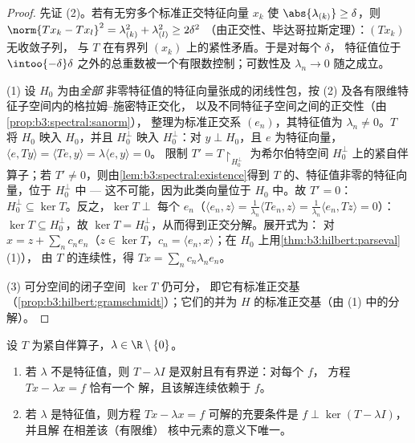 \begin{proof}
先证 (2)。若有无穷多个标准正交特征向量 $x_k$
使 $\abs{\lambda_{(k)}} \geq \delta$，则 $\norm{Tx_k - Tx_l}^2 =
\lambda_{(k)}^2 + \lambda_{(l)}^2 \geq 2\delta^2$
（由正交性、毕达哥拉斯定理）：$(Tx_k)$ 无收敛子列，
与 $T$ 在有界列
$(x_k)$ 上的紧性矛盾。于是对每个 $\delta$，
特征值位于
$\intoo{-\delta}\delta$ 之外的总重数被一个有限数控制；可数性及 $\lambda_n \to 0$
随之成立。

(1) 设 $H_0$ 为由\emph{全部}
非零特征值的特征向量张成的闭线性包，按
(2) 及各有限维特征子空间内的格拉姆–施密特正交化，
以及不同特征子空间之间的正交性（由\cref{prop:b3:spectral:sanorm}），
整理为标准正交系
$(e_n)$，其特征值为 $\lambda_n \neq 0$。$T$ 将 $H_0$
映入 $H_0$，并且 $H_0^\perp$ 映入 $H_0^\perp$：对 $y
\perp H_0$，且 $e$ 为特征向量，$\langle e, Ty\rangle =
\langle Te, y\rangle = \lambda\langle e, y\rangle = 0$。
限制 $T' = T\restriction_{H_0^\perp}$ 为希尔伯特空间
$H_0^\perp$ 上的紧自伴算子；若 $T' \neq
0$，则由\cref{lem:b3:spectral:existence}得到
$T$ 的、特征值非零的特征向量，位于 $H_0^\perp$ 中 ---
这不可能，因为此类向量位于 $H_0$ 中。故 $T' = 0$：
$H_0^\perp \subseteq \ker T$。反之，$\ker T \perp$ 每个
$e_n$（$\langle e_n, z\rangle = \frac1{\lambda_n}\langle
Te_n, z\rangle = \frac1{\lambda_n}\langle e_n, Tz\rangle =
0$）：$\ker T \subseteq H_0^\perp$，故 $\ker T =
H_0^\perp$，从而得到正交分解。展开式为：
对 $x = z + \sum_nc_ne_n$（$z \in \ker T$，$c_n = \langle
e_n, x\rangle$；在 $H_0$ 上用\cref{thm:b3:hilbert:parseval}(1)），
由 $T$ 的连续性，得 $Tx = \sum_nc_n\lambda_ne_n$。

(3) 可分空间的闭子空间 $\ker T$ 仍可分，
即它有标准正交基
（\cref{prop:b3:hilbert:gramschmidt}）；它们的并为
$H$ 的标准正交基（由 (1) 中的分解）。
\end{proof}

\begin{theorem}[弗雷德霍姆择一定理]
\label{thm:b3:spectral:fredholm}
设 $T$ 为紧自伴算子，$\lambda \in \R\setminus
\{0\}$。
\begin{enumerate}
  \item 若 $\lambda$ 不是特征值，则 $T - \lambda I$
        是双射且有有界逆：对每个 $f$，
        方程 $Tx - \lambda x = f$ 恰有一个
        解，且该解连续依赖于 $f$。
  \item 若 $\lambda$ 是特征值，则方程 $Tx - \lambda x = f$
        可解的充要条件是 $f \perp \ker(T - \lambda I)$，并且解
        在相差该（有限维）
        核中元素的意义下唯一。
\end{enumerate}
\end{theorem}

